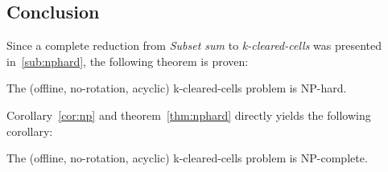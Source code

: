 \subsection{Conclusion}

Since a complete reduction from \textit{Subset sum} to \textit{k-cleared-cells} was presented in~\ref{sub:nphard}, the following theorem is proven: \\

\begin{thm}
\label{thm:nphard}
The (offline, no-rotation, acyclic) k-cleared-cells problem is NP-hard.
\end{thm}

Corollary~\ref{cor:np} and theorem~\ref{thm:nphard} directly yields the following corollary: \\

\begin{cor}
The (offline, no-rotation, acyclic) k-cleared-cells problem is NP-complete.
\end{cor}
